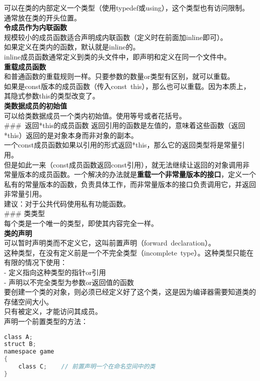 \documentclass[
  a4paper,
  oneside,tablecaptionabove
]{scrbook}
\begin{document}
可以在类的内部定义一个类型（使用typedef或using），这个类型也有访问限制。\\
通常放在类的开头位置。\\
\textbf{令成员作为内联函数}\\
规模较小的成员函数适合声明成内联函数（定义时在前面加inline即可）。\\
如果定义在类内的函数，默认就是inline的。\\
inline成员函数通常定义到类的头文件中，即声明和定义在同一个文件中。\\
\textbf{重载成员函数}\\
和普通函数的重载规则一样。只要参数的数量or类型有区别，就可以重载。\\
如果是const版本的成员函数（传入const~this），那么也可以重载。因为本质上，其隐式参数this的类型改变了。\\
\textbf{类数据成员的初始值}\\
可以给类数据成员一个类内初始值。使用等号或者花括号。\\
\#\#\#~返回*this的成员函数
返回引用的函数是左值的，意味着这些函数（返回*this）返回的是对象本身而非对象的副本。\\
一个const成员函数如果以引用的形式返回*this，那么它的返回类型将是常量引用。\\
但是如此一来（const成员函数返回const引用），就无法继续让返回的对象调用非常量版本的成员函数。一个解决的办法就是\textbf{重载一个非常量版本的接口}，定义一个私有的常量版本的函数，负责具体工作，而非常量版本的接口负责调用它，并返回非常量引用。\\
建议：对于公共代码使用私有功能函数。\\
\#\#\# 类类型\\
每个类是一个唯一的类型，即使其内容完全一样。\\
\textbf{类的声明}\\
可以暂时声明类而不定义它，这叫前置声明（forward~declaration）。\\
这种类型，在没有定义前是一个不完全类型（incomplete~type）。这种类型只能在有限的情况下使用：\\
- 定义指向这种类型的指针or引用\\
- 声明以不完全类型为参数or返回值的函数\\
要创建一个类的对象，则必须已经定义好了这个类，这是因为编译器需要知道类的存储空间大小。\\
只有被定义，才能访问其成员。\\
声明一个前置类型的方法：

\begin{lstlisting}[language={C++}]
class A;
struct B;
namespace game
{
    class C;    // 前置声明一个在命名空间中的类
}
\end{lstlisting}
\end{document}
